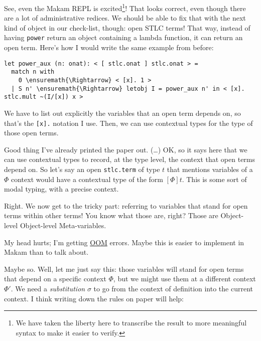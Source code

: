 \heroADVISOR{} See, even the Makam REPL is
excited\footnote{We have taken the liberty here to transcribe the result to more meaningful syntax to make it easier to verify.}!
That looks correct, even though there are a lot of administrative
redices. We should be able to fix that with the next kind of object in
our check-list, though: open STLC terms! That way, instead of having
\texttt{power} return an object containing a lambda function, it can
return an open term. Here's how I would write the same example from
before:

\begin{verbatim}
let power_aux (n: onat): < [ stlc.onat ] stlc.onat > =
  match n with
    0 \ensuremath{\Rightarrow} < [x]. 1 >
  | S n' \ensuremath{\Rightarrow} letobj I = power_aux n' in < [x]. stlc.mult ~(I/[x]) x >
\end{verbatim}

\noindent
We have to list out explicitly the variables that an open term depends
on, so that's the \texttt{{[}x{]}.} notation I use. Then, we can use
contextual types \citep{nanevski2008contextual} for the type of those
open terms.

\heroSTUDENT{} Good thing I've already printed the paper out. (\ldots{}) OK,
so it says here that we can use contextual types to record, at the type
level, the context that open terms depend on. So let's say an open
\texttt{stlc.term} of type \(t\) that mentions variables of a \(\Phi\)
context would have a contextual type of the form \([\Phi] t\). This is
some sort of modal typing, with a precise context.

\heroADVISOR{} Right. We now get to the tricky part: referring to variables
that stand for open terms within other terms! You know what those are,
right? Those are Object-level Object-level Meta-variables.

\heroSTUDENT{} My head hurts; I'm getting
\href{https://en.wikipedia.org/wiki/Out_of_memory}{OOM} errors. Maybe
this is easier to implement in Makam than to talk about.

\heroADVISOR{} Maybe so. Well, let me just say this: those variables will
stand for open terms that depend on a specific context \(\Phi\), but we
might use them at a different context \(\Phi'\). We need a
\emph{substitution} \(\sigma\) to go from the context of definition into
the current context. I think writing down the rules on paper will help:

